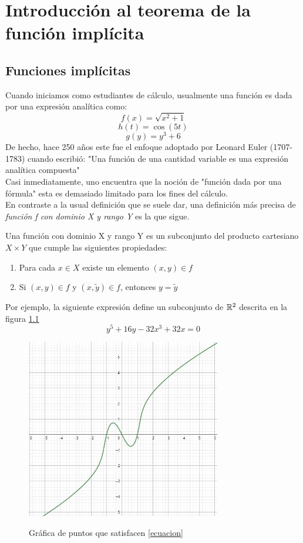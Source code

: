 \chapter{Introducción al teorema de la función implícita}
\section{Funciones implícitas}
Cuando iniciamos como estudiantes de cálculo, usualmente una función es dada por una expresión analítica como:
$$f(x)=\sqrt{x^2+1}$$
$$h(t)=\cos(5t)$$
$$g(y)=y^3+6$$
De hecho, hace 250 años este fue el enfoque adoptado por Leonard Euler (1707-1783) cuando escribió: "Una función de una cantidad variable es una expresión analítica compuesta"
\\Casi inmediatamente, uno encuentra que la noción de "función dada por una fórmula" esta es demasiado limitado para los fines del cálculo.\\En contraste a la usual definición que se suele dar, una definición más precisa de \textit{función f con dominio X y rango Y} es la que sigue.
\begin{Def}
Una función con dominio X y rango Y es un subconjunto del producto cartesiano $X\times Y$ que cumple las siguientes propiedades:
\begin{enumerate}
    \item  Para cada $x\in X$ existe un elemento $(x,y)\in f$
    \item Si $(x,y)\in f$ y $(x,\tilde{y})\in f$, entonces $y=\tilde{y}$
\end{enumerate}
\end{Def} 
Por ejemplo, la siguiente expresión define un subconjunto de ${\mathbb{R}}^2$ descrita en la figura \ref{Figura1_1}\\
\begin{equation}
    y^5+16y-32x^3+32x=0
    \label{ecuacion1}
\end{equation}
\begin{figure}[htb]
\begin{center}
\includegraphics[width=8.5cm]{img/figura1_1.jpg}
\label{Figura1_1}
\caption{Gráfica de puntos que satisfacen \ref{ecuacion}}
\vspace*{0.05in}
\end{center}
\end{figure}
